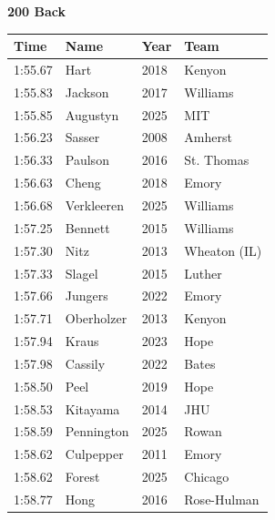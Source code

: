 \noindent\begin{minipage}[t]{0.98\textwidth}
\centering
\textbf{\textcolor{teamprimary}{200 Back}}\par
\vspace{0.5em}
\centering
\small
\renewcommand{\arraystretch}{1.0}
\setlength{\tabcolsep}{4pt}
\begin{tabular}{@{}p{2.5cm}p{4.5cm}p{1.5cm}p{2.5cm}@{}}
\toprule
\textbf{Time} & \textbf{Name} & \textbf{Year} & \textbf{Team} \\
\midrule
1:55.67 & Hart & 2018 & Kenyon \\
1:55.83 & Jackson & 2017 & Williams \\
1:55.85 & Augustyn & 2025 & MIT \\
1:56.23 & Sasser & 2008 & Amherst \\
1:56.33 & Paulson & 2016 & St. Thomas \\
1:56.63 & Cheng & 2018 & Emory \\
1:56.68 & Verkleeren & 2025 & Williams \\
1:57.25 & Bennett & 2015 & Williams \\
1:57.30 & Nitz & 2013 & Wheaton (IL) \\
1:57.33 & Slagel & 2015 & Luther \\
1:57.66 & Jungers & 2022 & Emory \\
1:57.71 & Oberholzer & 2013 & Kenyon \\
1:57.94 & Kraus & 2023 & Hope \\
1:57.98 & Cassily & 2022 & Bates \\
1:58.50 & Peel & 2019 & Hope \\
1:58.53 & Kitayama & 2014 & JHU \\
1:58.59 & Pennington & 2025 & Rowan \\
1:58.62 & Culpepper & 2011 & Emory \\
1:58.62 & Forest & 2025 & Chicago \\
1:58.77 & Hong & 2016 & Rose-Hulman \\
\bottomrule
\end{tabular}
\end{minipage}
\vspace{1.2em}
